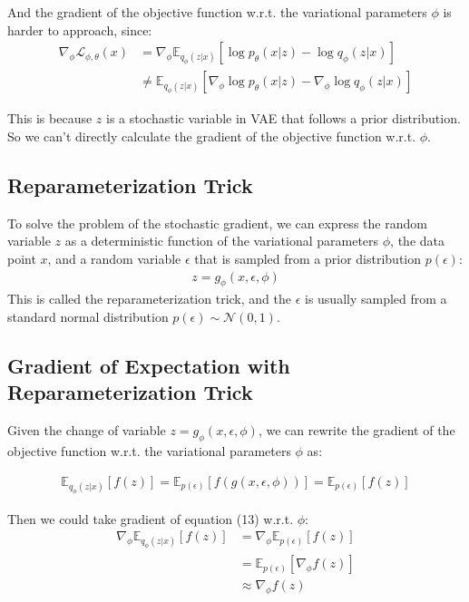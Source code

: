 \documentclass[11pt]{article}
\theoremstyle{definition}
\begin{document}
And the gradient of the objective function w.r.t. the variational parameters $\phi$ is harder to approach, since:
\begin{align}
    \nabla_\phi \mathcal{L}_{\phi, \theta}(x) &= \nabla_\phi\mathbb{E}_{q_\phi(z|x)}[\log p_\theta(x|z) - \log q_\phi(z|x)]\\
    &\neq \mathbb{E}_{q_\phi(z|x)}[\nabla_\phi\log p_\theta(x|z) - \nabla_\phi\log q_\phi(z|x)]
\end{align}

This is because $z$ is a stochastic variable in VAE that follows a prior distribution. So we can't directly calculate the gradient of the objective function w.r.t. $\phi$.

\subsection{Reparameterization Trick}

To solve the problem of the stochastic gradient, we can express the random variable $z$ as a deterministic function of the variational parameters $\phi$, the data point $x$, and a random variable $\epsilon$ that is sampled from a prior distribution $p(\epsilon)$:
\begin{align}
    z=g_\phi(x, \epsilon, \phi)
\end{align}
This is called the reparameterization trick, and the $\epsilon$ is usually sampled from a standard normal distribution $p(\epsilon) \sim \mathcal{N}(0, 1)$.

\subsection{Gradient of Expectation with Reparameterization Trick}

Given the change of variable $z=g_\phi(x, \epsilon, \phi)$, we can rewrite the gradient of the objective function w.r.t. the variational parameters $\phi$ as:

\begin{align}
    \mathbb{E}_{q_\phi(z|x)}[f(z)] = \mathbb{E}_{p(\epsilon)}[f(g(x, \epsilon, \phi))] = \mathbb{E}_{p(\epsilon)}[f(z)]
\end{align}

Then we could take gradient of equation (13) w.r.t. $\phi$:
\begin{align}
    \nabla_\phi \mathbb{E}_{q_\phi(z|x)}[f(z)] &= \nabla_\phi \mathbb{E}_{p(\epsilon)}[f(z)]\\
    &= \mathbb{E}_{p(\epsilon)}[\nabla_\phi f(z)]\\
    &\approx \nabla_\phi f(z)
\end{align}
\end{document}
